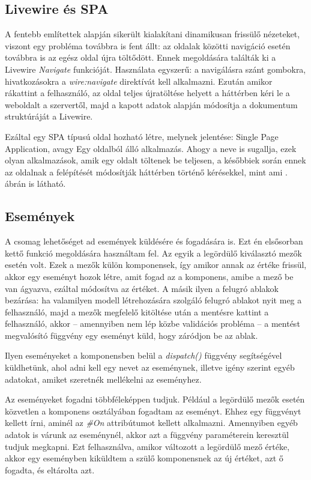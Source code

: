 \documentclass[
]{thesis-ekf}
\theoremstyle{definition}
\theoremstyle{remark}
\begin{document}
\subsection{Livewire és SPA}

A fentebb említettek alapján sikerült kialakítani dinamikusan frissülő nézeteket, viszont egy probléma továbbra is fent állt: az oldalak közötti navigáció esetén továbbra is az egész oldal újra töltődött. Ennek megoldására találták ki a Livewire \emph{Navigate}\cite{navigate} funkcióját. Használata egyszerű: a navigálásra szánt gombokra, hivatkozásokra a \emph{wire:navigate} direktívát kell alkalmazni. Ezután amikor rákattint a felhasználó, az oldal teljes újratöltése helyett a háttérben kéri le a weboldalt a szervertől, majd a kapott adatok alapján módosítja a dokumentum struktúráját a Livewire.

Ezáltal egy SPA típusú oldal hozható létre, melynek jelentése: Single Page Application, avagy Egy oldalból álló alkalmazás. Ahogy a neve is sugallja, ezek olyan alkalmazások, amik egy oldalt töltenek be teljesen, a későbbiek során ennek az oldalnak a felépítését módosítják háttérben történő kérésekkel, mint ami . ábrán is látható.\cite{spa}

\subsection{Események}
\label{livewireevents}
A csomag lehetőséget ad események küldésére és fogadására is. Ezt én elsősorban kettő funkció megoldására használtam fel. Az egyik a legördülő kiválasztó mezők esetén volt. Ezek a mezők külön komponensek, így amikor annak az értéke frissül, akkor egy eseményt hozok létre, amit fogad az a komponens, amibe a mező be van ágyazva, ezáltal módosítva az értéket. A másik ilyen a felugró ablakok bezárása: ha valamilyen modell létrehozására szolgáló felugró ablakot nyit meg a felhasználó, majd a mezők megfelelő kitöltése után a mentésre kattint a felhasználó, akkor -- amennyiben nem lép közbe validációs probléma -- a mentést megvalósító függvény egy eseményt küld, hogy záródjon be az ablak.

Ilyen eseményeket a komponensben belül a \emph{dispatch()} függvény segítségével küldhetünk, ahol adni kell egy nevet az eseménynek, illetve igény szerint egyéb adatokat, amiket szeretnék mellékelni az eseményhez.

Az eseményeket fogadni többféleképpen tudjuk. Például a legördülő mezők esetén közvetlen a komponens osztályában fogadtam az eseményt. Ehhez egy függvényt kellett írni, aminél az \emph{\#On} attribútumot kellett alkalmazni. Amennyiben egyéb adatok is várunk az eseménynél, akkor azt a függvény paraméterein keresztül tudjuk megkapni. Ezt felhasználva, amikor változott a legördülő mező értéke, akkor egy eseményben kiküldtem a szülő komponensnek az új értéket, azt ő fogadta, és eltárolta azt.
\end{document}
